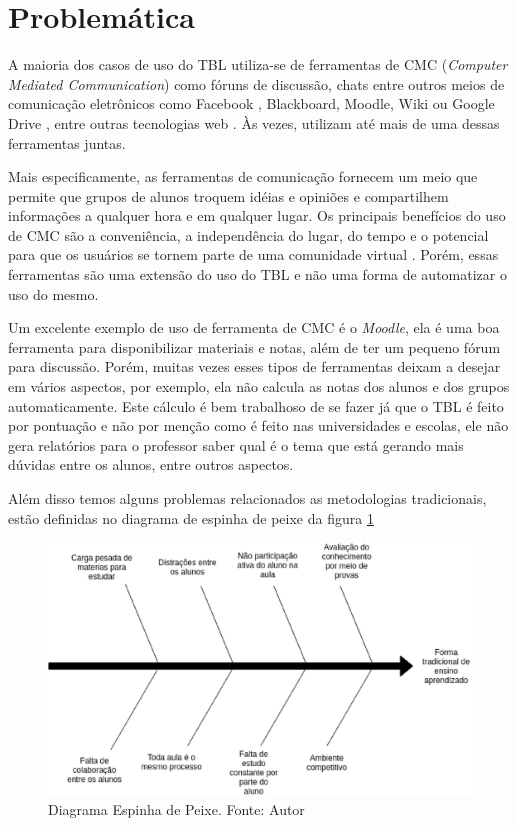 \section{Problemática}

A maioria dos casos de uso do TBL utiliza-se de ferramentas de CMC (\textit{Computer Mediated Communication}) como fóruns de discussão, chats entre outros meios de comunicação eletrônicos como Facebook \cite{alhomod}, Blackboard, Moodle, Wiki ou Google Drive \cite{awatramani}, entre outras tecnologias web \cite{kam}. Às vezes, utilizam até mais de uma dessas ferramentas juntas.

Mais especificamente, as ferramentas de comunicação fornecem um meio que permite que grupos de alunos troquem idéias e opiniões e compartilhem informações a qualquer hora e em qualquer lugar. Os principais benefícios do uso de CMC são a conveniência, a independência do lugar, do tempo e o potencial para que os usuários se tornem parte de uma comunidade virtual \cite{berge}. Porém, essas ferramentas são uma extensão do uso do TBL e não uma forma de automatizar o uso do mesmo.

Um excelente exemplo de uso de ferramenta de CMC é o \textit{Moodle}, ela é uma boa ferramenta para disponibilizar materiais e notas, além de ter um pequeno fórum para discussão. Porém, muitas vezes esses tipos de ferramentas deixam a desejar em vários aspectos, por exemplo, ela não calcula as notas dos alunos e dos grupos automaticamente. Este cálculo é bem trabalhoso de se fazer já que o TBL é feito por pontuação e não por menção como é feito nas universidades e escolas, ele não gera relatórios para o professor saber qual é o tema que está gerando mais dúvidas entre os alunos, entre outros aspectos.

Além disso temos alguns problemas relacionados as metodologias tradicionais, estão definidas no diagrama de espinha de peixe da figura \ref{fig:fishbone}

\begin{figure}[H]
	\centering
  \includegraphics[keepaspectratio=true,scale=0.5]{figuras/fishbone.eps}
  \caption[Diagrama Espinha de Peixe]{Diagrama Espinha de Peixe. Fonte: Autor}
	\label{fig:fishbone}
\end{figure}

